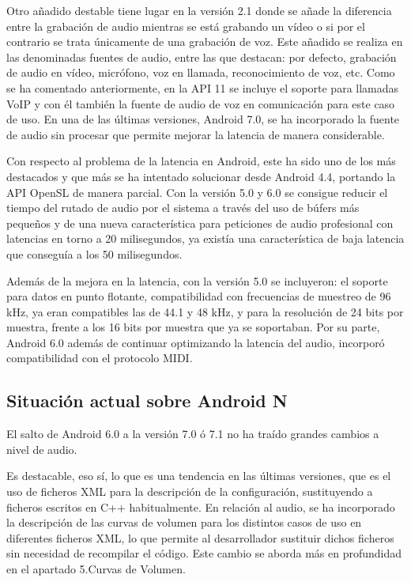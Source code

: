 Otro añadido destable tiene lugar en la versión 2.1 donde se añade la diferencia entre la grabación de audio mientras se está grabando un vídeo o si por el contrario se trata únicamente de una grabación de voz. Este añadido se realiza en las denominadas fuentes de audio, entre las que destacan: por defecto, grabación de audio en vídeo, micrófono, voz en llamada, reconocimiento de voz, etc. Como se ha comentado anteriormente, en la \gls{API} 11 se incluye el soporte para llamadas \gls{VoIP} y con él también la fuente de audio de voz en comunicación para este caso de uso. En una de las últimas versiones, Android 7.0, se ha incorporado la fuente de audio sin procesar que permite mejorar la latencia de manera considerable.

Con respecto al problema de la latencia en Android, este ha sido uno de los más destacados y que más se ha intentado solucionar desde Android 4.4, portando la \gls{API} OpenSL de manera parcial. Con la versión 5.0 y 6.0 se consigue reducir el tiempo del rutado de audio por el sistema a través del uso de búfers más pequeños y de una nueva característica para peticiones de audio profesional con latencias en torno a 20 milisegundos, ya existía una característica de baja latencia que conseguía a los 50 milisegundos.

Además de la mejora en la latencia, con la versión 5.0 se incluyeron: el soporte para datos en punto flotante, compatibilidad con frecuencias de muestreo de 96 kHz, ya eran compatibles las de 44.1 y 48 kHz, y para la resolución de 24 bits por muestra, frente a los 16 bits por muestra que ya se soportaban.
Por su parte, Android 6.0 además de continuar optimizando la latencia del audio, incorporó compatibilidad con el protocolo \gls{MIDI}.


\subsection{Situación actual sobre Android N}
El salto de Android 6.0 a la versión 7.0 ó 7.1 no ha traído grandes cambios a nivel de audio.

Es destacable, eso sí, lo que es una tendencia en las últimas versiones, que es el uso de ficheros XML para la descripción de la configuración, sustituyendo a ficheros escritos en C++ habitualmente. En relación al audio, se ha incorporado la descripción de las curvas de volumen para los distintos casos de uso en diferentes ficheros XML, lo que permite al desarrollador sustituir dichos ficheros sin necesidad de recompilar el código. Este cambio se aborda más en profundidad en el apartado 5.Curvas de Volumen. %

